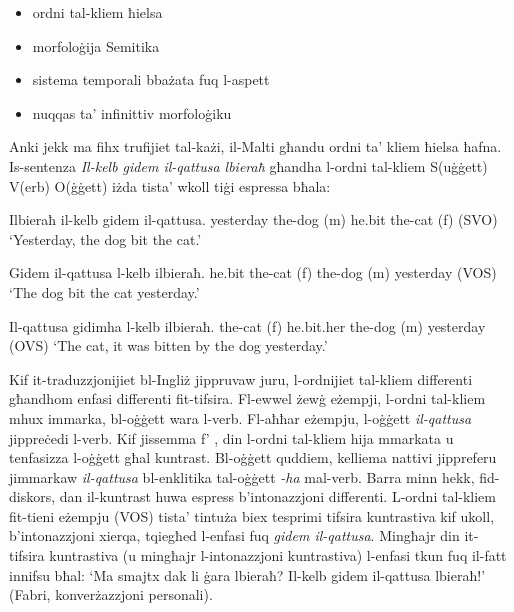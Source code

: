 \begin{multicols}{2}
\begin{itemize}
\item ordni tal-kliem ħielsa  
\item morfoloġija Semitika
\item sistema temporali bbażata fuq l-aspett  
\item nuqqas ta’ infinittiv morfoloġiku
\end{itemize}


Anki jekk ma fihx trufijiet tal-każi, il-Malti għandu ordni ta’ kliem ħielsa ħafna. Is-sentenza \emph{Il-kelb gidem il-qattusa lbieraħ} għandha l-ordni tal-kliem S(uġġett) V(erb) O(ġġett) iżda tista’ wkoll tiġi espressa bħala:

\begin{examples}\label{WO_no_clitics}
\item
\gll Ilbieraħ il-kelb gidem il-qattusa.
yesterday	{the-dog (m)} he.bit	{the-cat (f)}
\gln (SVO)
\glt `Yesterday, the dog bit the cat.'
\glend

\item
\gll Gidem il-qattusa l-kelb ilbieraħ.
he.bit {the-cat (f)} {the-dog (m)} yesterday
\gln (VOS)
\glt `The dog bit the cat yesterday.'
\glend

\item
\gll Il-qattusa gidimha l-kelb ilbieraħ.
{the-cat (f)} he.bit.her {the-dog (m)} yesterday
\gln (OVS)
\glt `The cat, it was bitten by the dog yesterday.'
\glend
\end{examples}

Kif it-traduzzjonijiet bl-Ingliż jippruvaw juru, l-ordnijiet tal-kliem differenti għandhom enfasi differenti fit-tifsira. Fl-ewwel żewġ eżempji, l-ordni tal-kliem mhux immarka, bl-oġġett wara l-verb. Fl-aħħar eżempju, l-oġġett \emph{il-qattusa} jippreċedi l-verb. Kif jissemma f' \cite[p.~140]{Fabri:1993}, din l-ordni tal-kliem hija mmarkata u tenfasizza l-oġġett għal kuntrast. Bl-oġġett quddiem, kelliema nattivi jippreferu jimmarkaw \emph{il-qattusa} bl-enklitika tal-oġġett \emph{-ha} mal-verb. Barra minn hekk, fid-diskors, dan il-kuntrast huwa espress b’intonazzjoni differenti. L-ordni tal-kliem fit-tieni eżempju (VOS) tista’ tintuża biex tesprimi tifsira kuntrastiva kif ukoll, b’intonazzjoni xierqa, tqiegħed l-enfasi fuq \emph{gidem il-qattusa}. Mingħajr din it-tifsira kuntrastiva (u mingħajr l-intonazzjoni kuntrastiva) l-enfasi tkun fuq il-fatt innifsu bħal: `Ma smajtx dak li ġara lbieraħ? Il-kelb gidem il-qattusa lbieraħ!' (Fabri, konverżazzjoni personali).


\end{multicols}

